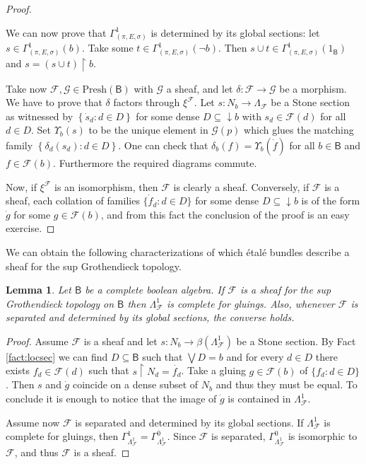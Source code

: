\documentclass[11pt]{amsart}
\newcommand{\F}{\mathcal{F}}
\newcommand{\G}{\mathcal{G}}
\newcommand{\Presh}{\textrm{Presh}}
\theoremstyle{plain}
\newtheorem{lemma}[theorem]{Lemma}
\theoremstyle{definition}
\theoremstyle{plain}
\theoremstyle{remark}
\newcommand{\bool}[1]{\mathsf{#1}}
\newcommand{\bp}[1]{\left\lbrace #1 \right\rbrace}
\newcommand{\0}{\mathsf{0}}
\renewcommand{\1}{\mathsf{1}}
\renewcommand{\2}{\mathsf{2}}
\theoremstyle{definition}
\begin{document}
\begin{proof}
\begin{description}
We can now prove that $\Gamma^1_{(\pi, E, \sigma)}$ is determined by its global sections: let $s\in\Gamma^1_{(\pi, E, \sigma)}(b)$. Take some $t\in\Gamma^1_{(\pi, E, \sigma)}(\neg b)$. Then $s\cup t\in\Gamma^1_{(\pi, E, \sigma)}(1_{\bool{B}})$ and $s=(s\cup t)\restriction b$.
\end{description}
Take now $\F, \G\in\Presh(\bool{B})$ with $\G$ a sheaf, and let $\delta:\F\to\G$ be a morphism. We have to prove that $\delta$ factors through $\xi^\F$.
 Let $s:N_b\to \Lambda_\F$ be a Stone section as witnessed by
$\bp{\dot{s}_d:d\in D}$ for some dense $D\subseteq\downarrow b$ with $s_d\in \F(d)$ for all $d\in D$. Set $\Upsilon_b(s)$ to be the unique element in $\G(p)$ which glues
the matching family $\bp{\delta_d(s_d):d\in D}$. One can check that
$\delta_b(f)=\Upsilon_b(\dot{f})$ for all $b\in\bool{B}$ and $f\in \F(b)$. Furthermore the required diagrams commute.

Now, if $\xi^\F$ is an isomorphism, then $\F$ is clearly a sheaf. Conversely, if $\F$ is a sheaf, each collation of families $\{\dot{f}_d: d\in D\}$ for some dense $D\subseteq\downarrow b$ is of the form $\dot{g}$ for some $g\in\F(b)$, and from this fact the conclusion of the proof is an easy exercise.
\end{proof}



We can obtain the following characterizations of which \'etal\'e bundles describe a sheaf for the sup Grothendieck topology.
\begin{lemma}\label{lem:charbundleissheaf}
Let $\bool{B}$ be a complete boolean algebra. If $\F$ is a sheaf for the sup Grothendieck topology on $\bool{B}$ then $\Lambda^1_\F$ is complete for gluings. Also, whenever $\F$ is separated and determined by its global sections, the converse holds.
\end{lemma}
\begin{proof}
Assume $\F$ is a sheaf and let $s:N_b\to \beta(\Lambda^1_\F)$ be a Stone section. By Fact \ref{fact:locsec} we can find $D\subseteq \bool{B}$ such that $\bigvee D=b$ and for every $d\in D$ there exists $f_d\in\F(d)$ such that $s\restriction N_d=\dot{f_d}$. Take a gluing $g\in\F(b)$ of $\{f_d: d\in D\}$. Then $s$ and $\dot{g}$ coincide on a dense subset of $N_b$ and thus they must be equal. To conclude it is enough to notice that the image of $\dot{g}$ is contained in $\Lambda^1_\F$.

Assume now $\F$ is separated and determined by its global sections. If $\Lambda^1_\F$ is complete for gluings, then $\Gamma^1_{\Lambda^1_\F}=\Gamma^0_{\Lambda^1_\F}$. Since $\F$ is separated, $\Gamma^0_{\Lambda^1_\F}$ is isomorphic to $\F$, and thus $\F$ is a sheaf.
\end{proof}
\end{document}
